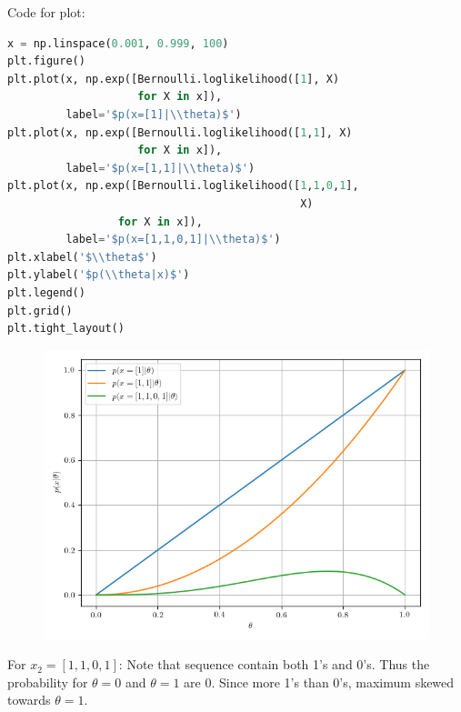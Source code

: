 \documentclass[usenames,dvipsnames,table]{beamer}
\begin{document}
\begin{frame}[fragile]
Code for plot:
\begin{lstlisting}[language=Python]
x = np.linspace(0.001, 0.999, 100)
plt.figure()
plt.plot(x, np.exp([Bernoulli.loglikelihood([1], X)
                    for X in x]),
         label='$p(x=[1]|\\theta)$')
plt.plot(x, np.exp([Bernoulli.loglikelihood([1,1], X)
                    for X in x]),
         label='$p(x=[1,1]|\\theta)$')
plt.plot(x, np.exp([Bernoulli.loglikelihood([1,1,0,1],
                                             X)
                 for X in x]),
         label='$p(x=[1,1,0,1]|\\theta)$')
plt.xlabel('$\\theta$')
plt.ylabel('$p(\\theta|x)$')
plt.legend()
plt.grid()
plt.tight_layout()
\end{lstlisting}
\end{frame}

\begin{frame}
\begin{figure}
\centering
\includegraphics[height=0.7\textheight]{img/ex3B4d.png}
\end{figure}

For $x_2=[1,1,0,1]$: Note that sequence contain both 1's and 0's. Thus the probability for $\theta=0$ and $\theta=1$ are 0. Since more 1's than 0's, maximum skewed towards $\theta=1$.

\end{frame}
\end{document}

